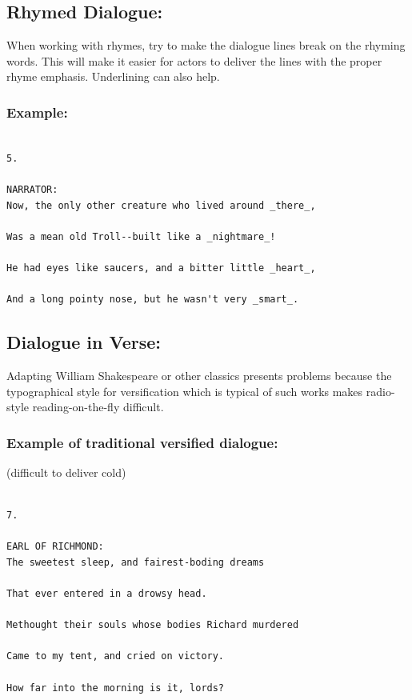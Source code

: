 \documentclass[openleft,oneside,showtrims]{memoir}
\begin{document}
\subsection{Rhymed Dialogue:}
\label{sec:orgbca6ecc}
When working with rhymes, try to make the dialogue lines break on the rhyming words. This will make it easier for actors to deliver the lines with the proper rhyme emphasis. Underlining can also help.

\subsubsection*{Example:}
\label{sec:org3b16d4a}

\lstset{language=fountain,label= ,caption= ,captionpos=b,numbers=none}
\begin{lstlisting}

5.

NARRATOR:
Now, the only other creature who lived around _there_,
  
Was a mean old Troll--built like a _nightmare_!
  
He had eyes like saucers, and a bitter little _heart_,
  
And a long pointy nose, but he wasn't very _smart_.

\end{lstlisting}
\subsection{Dialogue in Verse:}
\label{sec:org1bfaf66}
Adapting William Shakespeare or other classics presents problems because the typographical style for versification which is typical of such works makes radio-style reading-on-the-fly difficult.

\subsubsection*{Example of traditional versified dialogue:}
\label{sec:org3bc3038}
(difficult to deliver cold)

\lstset{language=fountain,label= ,caption= ,captionpos=b,numbers=none}
\begin{lstlisting}

7.

EARL OF RICHMOND:
The sweetest sleep, and fairest-boding dreams
  
That ever entered in a drowsy head.
  
Methought their souls whose bodies Richard murdered
  
Came to my tent, and cried on victory.
  
How far into the morning is it, lords?

\end{lstlisting}
\end{document}
